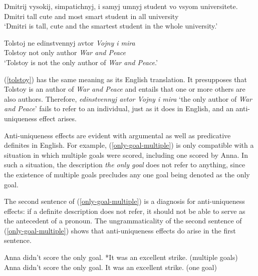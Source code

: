 \documentclass{article}
\begin{document}
\begin{exe}
	\ex \gll Dmitrij vysokij, simpatichnyj, i samyj umnyj student vo vsyom universitete.\\
	Dmitri tall cute and most smart student in all university\\
	`Dmitri is tall, cute and the smartest student in the whole university.'
\end{exe}


\begin{exe}
	\ex \label{tolstoy} \gll Tolstoj ne edinstvennyj avtor \textit{Vojny i mira}\\
	Tolstoy not only author \textit{War and Peace}\\
	\glt `Tolstoy is not the only author of \textit{War and Peace}.'
\end{exe}

(\ref{tolstoy}) has the same meaning as its English translation. It presupposes that Tolstoy is an author of \textit{War and Peace} and entails that one or more others are also authors. Therefore, \textit{edinstvennyj avtor Vojny i mira} `the only author of \textit{War and Peace}' fails to refer to an individual, just as it does in English, and an anti-uniqueness effect arises.

Anti-uniqueness effects are evident with argumental as well as predicative definites in English. For example, (\ref{only-goal-multiple}) is only compatible with a situation in which multiple goals were scored, including one scored by Anna. In such a situation, the description \textit{the only goal} does not refer to anything, since the existence of multiple goals precludes any one goal being denoted as the only goal.

The second sentence of (\ref{only-goal-multiple}) is a diagnosis for anti-uniqueness effects: if a definite description does not refer, it should not be able to serve as the antecedent of a pronoun. The ungrammaticality of the second sentence of (\ref{only-goal-multiple}) shows that anti-uniqueness effects do arise in the first sentence.

\begin{exe}
	\ex \label{only-goal-multiple} Anna didn't score the only goal. *It was an excellent strike. (multiple goals)
	\ex \label{only-goal-one} Anna didn't score the only goal. It was an excellent strike. (one goal)
\end{exe}
\end{document}
